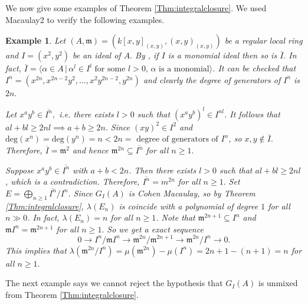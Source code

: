 \documentclass[11pt]{amsart}
\theoremstyle{plain}
\newtheorem{example}[theorem]{Example}
\newcommand{\m}{\mathfrak{m}}
\theoremstyle{plain}
\begin{document}
We now give some examples of Theorem \ref{Thm:integralclosure}. We used Macaulay2 \cite{M2} to verify the following examples.
\begin{example}
\normalfont
   Let $(A,\m)=(k[x,y]_{(x,y)}, (x,y)_{(x,y)})$ be a regular local ring and $I=(x^2,y^2)$ be an ideal of $A.$  By \cite[Proposition 12.1.1, 12.1.2]{Monomial}, if $I$ is a monomial ideal then so is $\overline{I}.$ In fact, $\overline{I}=\langle \alpha\in A\, |\, \alpha^l\in I^l \text{ for some $l>0$, $\alpha$ is a monomial}\rangle$. It can be checked that $I^n=(x^{2n},x^{2n-2}y^2,\ldots ,x^2y^{2n-2},y^{2n})$ and clearly the degree of generators of $I^n$ is $2n.$

   Let $x^ay^b\in \overline{I^n},$ i.e. there exists $l>0$ such that $(x^ay^b)^l\in I^{nl}$. It follows that $al+bl\geq 2nl\implies a+b\geq 2n.$ Since $(xy)^2\in I^2$ and $\text{deg}(x^n)=\text{deg}(y^n)=n<2n=\text{ degree of generators of } I^n$, so $x,y\notin \overline{I}.$ Therefore, $\overline{I}=\m^2$ and hence $\m^{2n}\subseteq \overline{I^n}$ for all $n\geq 1.$

    Suppose $x^ay^b\in \overline{I^n}$ with $a+b<2n$. Then there exists $l>0$ such that $al+bl\geq 2nl$, which is a contradiction. Therefore, $\overline{I^n}=m^{2n}$ for all $n\geq 1.$ Set $E=\bigoplus_{n\geq 1}\overline{I^n}/I^n.$ Since $G_I(A)$ is Cohen Macaulay, so by Theorem \ref{Thm:integralclosure}, $\lambda(E_n)$ is coincide with a polynomial of degree $1$ for all $n\gg0$. In fact, $\lambda(E_n)=n$ for all $n\geq 1$. Note that $\m^{2n+1}\subseteq I^n$ and $\m I^n=\m^{2n+1}$ for all $n\geq 1.$ So we get a exact sequence $$0\to I^n/\m I^n\to \m^{2n}/\m^{2n+1}\to \m^{2n}/I^n\to 0.$$ This implies that $\lambda(\m^{2n}/I^n)=\mu(\m^{2n})-\mu(I^n)=2n+1-(n+1)=n$ for all $n\geq 1.$
\end{example}

The next example says we cannot reject the hypothesis that $G_I(A)$ is unmixed from Theorem \ref{Thm:integralclosure}.
\end{document}
